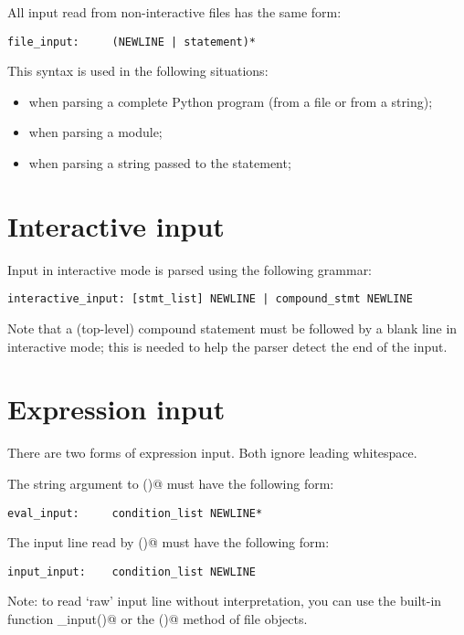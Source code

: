 All input read from non-interactive files has the same form:

\begin{verbatim}
file_input:     (NEWLINE | statement)*
\end{verbatim}

This syntax is used in the following situations:

\begin{itemize}

\item when parsing a complete Python program (from a file or from a string);

\item when parsing a module;

\item when parsing a string passed to the \verb@exec@ statement;

\end{itemize}

\section{Interactive input}

Input in interactive mode is parsed using the following grammar:

\begin{verbatim}
interactive_input: [stmt_list] NEWLINE | compound_stmt NEWLINE
\end{verbatim}

Note that a (top-level) compound statement must be followed by a blank
line in interactive mode; this is needed to help the parser detect the
end of the input.

\section{Expression input}

There are two forms of expression input.  Both ignore leading
whitespace.
 
The string argument to \verb@eval()@ must have the following form:

\begin{verbatim}
eval_input:     condition_list NEWLINE*
\end{verbatim}

The input line read by \verb@input()@ must have the following form:

\begin{verbatim}
input_input:    condition_list NEWLINE
\end{verbatim}

Note: to read `raw' input line without interpretation, you can use the
built-in function \verb@raw_input()@  or the \verb@readline()@ method
of file objects.

